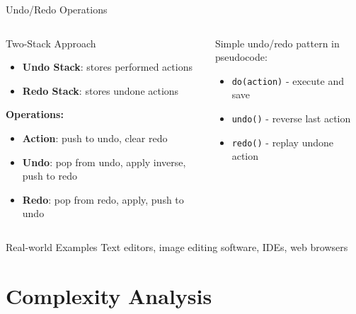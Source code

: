 \documentclass[aspectratio=169,xcolor=dvipsnames]{beamer}
\begin{document}
\begin{frame}{Undo/Redo Operations}
  \begin{columns}
    \begin{column}{0.5\textwidth}
      \begin{block}{Two-Stack Approach}
        \begin{itemize}
          \item \textbf{Undo Stack}: stores performed actions
          \item \textbf{Redo Stack}: stores undone actions
        \end{itemize}
      \end{block}
      
      \textbf{Operations:}
      \begin{itemize}
        \item \textbf{Action}: push to undo, clear redo
        \item \textbf{Undo}: pop from undo, apply inverse, push to redo
        \item \textbf{Redo}: pop from redo, apply, push to undo
      \end{itemize}
    \end{column}
    \begin{column}{0.45\textwidth}
      Simple undo/redo pattern in pseudocode:
      \begin{itemize}
        \item \texttt{do(action)} - execute and save
        \item \texttt{undo()} - reverse last action
        \item \texttt{redo()} - replay undone action
      \end{itemize}
    \end{column}
  \end{columns}
  
  \vspace{0.3cm}
  \begin{exampleblock}{Real-world Examples}
    Text editors, image editing software, IDEs, web browsers
  \end{exampleblock}
\end{frame}

\section{Complexity Analysis}
\end{document}
